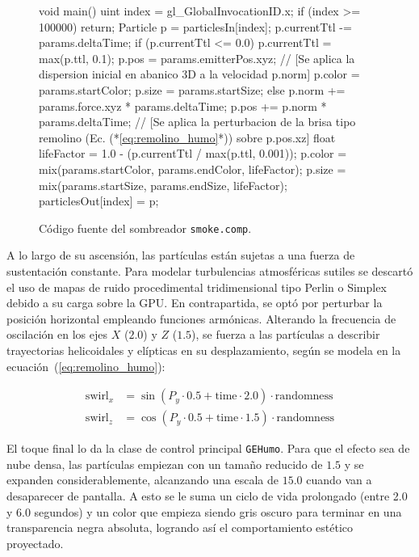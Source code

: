 \begin{figure}[!htbp]
    \centering
\begin{carbonbox}
void main() {
    uint index = gl_GlobalInvocationID.x; 
    if (index >= 100000) return;
    Particle p = particlesIn[index];
    p.currentTtl -= params.deltaTime;
    if (p.currentTtl <= 0.0) {
        p.currentTtl = max(p.ttl, 0.1); 
        p.pos = params.emitterPos.xyz;
        // [Se aplica la dispersion inicial en abanico 3D a la velocidad p.norm]
        p.color = params.startColor;
        p.size = params.startSize;
    } else {
        p.norm += params.force.xyz * params.deltaTime;
        p.pos += p.norm * params.deltaTime;
        // [Se aplica la perturbacion de la brisa tipo remolino (Ec. (*\ref{eq:remolino_humo}*)) sobre p.pos.xz]
        float lifeFactor = 1.0 - (p.currentTtl / max(p.ttl, 0.001));
        p.color = mix(params.startColor, params.endColor, lifeFactor);
        p.size = mix(params.startSize, params.endSize, lifeFactor);
    }
    particlesOut[index] = p;
}
\end{carbonbox}
    \caption{Código fuente del sombreador \texttt{smoke.comp}.}
    \label{fig:smoke_comp}
\end{figure}

A lo largo de su ascensión, las partículas están sujetas a una fuerza de sustentación constante. Para modelar turbulencias atmosféricas sutiles se descartó el uso de mapas de ruido procedimental tridimensional tipo Perlin o Simplex~\parencite{perlin1985an, perlin2002improving} debido a su carga sobre la GPU. En contrapartida, se optó por perturbar la posición horizontal empleando funciones armónicas. Alterando la frecuencia de oscilación en los ejes $X$ ($2.0$) y $Z$ ($1.5$), se fuerza a las partículas a describir trayectorias helicoidales y elípticas en su desplazamiento, según se modela en la ecuación~(\ref{eq:remolino_humo}):

\begin{equation}
    \label{eq:remolino_humo}
    \begin{aligned}
        \text{swirl}_x &= \sin(P_y \cdot 0.5 + \text{time} \cdot 2.0) \cdot \text{randomness} \\
        \text{swirl}_z &= \cos(P_y \cdot 0.5 + \text{time} \cdot 1.5) \cdot \text{randomness}
    \end{aligned}
\end{equation}

El toque final lo da la clase de control principal \texttt{GEHumo}. Para que el efecto sea de nube densa, las partículas empiezan con un tamaño reducido de $1.5$ y se expanden considerablemente, alcanzando una escala de $15.0$ cuando van a desaparecer de pantalla. A esto se le suma un ciclo de vida prolongado (entre 2.0 y 6.0 segundos) y un color que empieza siendo gris oscuro para terminar en una transparencia negra absoluta, logrando así el comportamiento estético proyectado.                            

